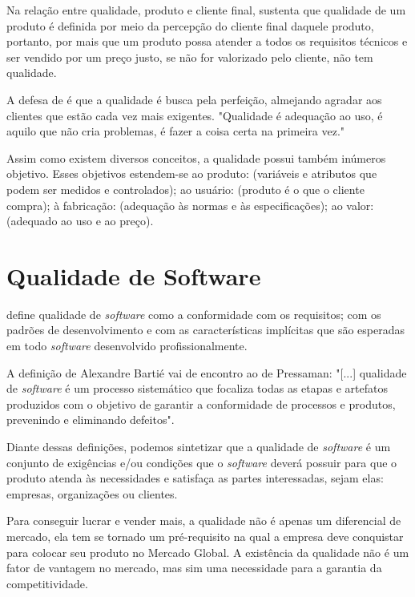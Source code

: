Na relação entre qualidade, produto e cliente final,  sustenta que qualidade de um produto é definida por meio da percepção do cliente final daquele produto, portanto, por mais que um produto possa atender a todos os requisitos técnicos e ser vendido por um preço justo, se não for valorizado pelo cliente, não tem qualidade.

A defesa de  é que a qualidade é busca pela perfeição, almejando agradar aos clientes que estão cada vez mais exigentes. "Qualidade é adequação ao uso, é aquilo que não cria problemas, é fazer a coisa certa na primeira vez." \cite[p. 15]{RANGEL1195}

Assim como existem diversos conceitos, a qualidade possui também inúmeros objetivo. Esses objetivos estendem-se ao produto: (variáveis e atributos que podem ser medidos e controlados); ao usuário: (produto é o que o cliente compra); à fabricação: (adequação às normas e às especificações); ao valor: (adequado ao uso e ao preço). \cite{MARTINSELAUGENI2006}





\section{Qualidade de Software}

 define qualidade de \textit{software} como a conformidade com os requisitos; com os padrões de desenvolvimento e com as características implícitas que são esperadas em todo \textit{software} desenvolvido profissionalmente. 
 
 A definição de Alexandre Bartié vai de encontro ao de Pressaman: "[...] qualidade de \textit{software} é um processo sistemático que focaliza todas as etapas e artefatos produzidos com o objetivo de garantir a conformidade de processos e produtos, prevenindo e eliminando defeitos". \cite[p. 12]{BARTIE2002}
 
 
 Diante dessas definições, podemos sintetizar que a qualidade de \textit{software} é um conjunto de exigências e/ou condições que o \textit{software} deverá possuir para que o produto atenda às necessidades e satisfaça as partes interessadas, sejam elas: empresas, organizações ou clientes.
 
 Para conseguir lucrar e vender mais, a qualidade não é apenas um diferencial de mercado, ela tem se tornado um pré-requisito na qual a empresa deve conquistar para colocar seu produto no Mercado Global. A existência da qualidade não é um fator de vantagem no mercado, mas sim uma necessidade para a garantia da competitividade. \cite{PRESSMAN2004}
 
